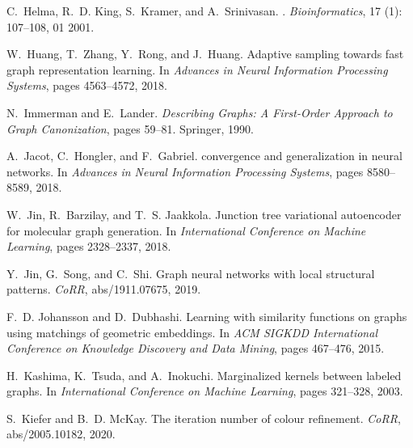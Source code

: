 \documentclass{article}
\theoremstyle{definition}
\begin{document}
\begin{thebibliography}{125}
	C.~Helma, R.~D. King, S.~Kramer, and A.~Srinivasan.
	.
	\newblock \emph{Bioinformatics}, 17 (1): 107--108, 01 2001.
	
	W.~Huang, T.~Zhang, Y.~Rong, and J.~Huang.
	\newblock Adaptive sampling towards fast graph representation learning.
	\newblock In \emph{Advances in Neural Information Processing Systems}, pages
	4563--4572, 2018.
	
	N.~Immerman and E.~Lander.
	\newblock \emph{Describing Graphs: {A} First-Order Approach to Graph
		Canonization}, pages 59--81.
	\newblock Springer, 1990.
	
	A.~Jacot, C.~Hongler, and F.~Gabriel.
	 convergence and generalization in neural
	networks.
	\newblock In \emph{Advances in Neural Information Processing Systems}, pages
	8580--8589, 2018.
	
	W.~Jin, R.~Barzilay, and T.~S. Jaakkola.
	\newblock Junction tree variational autoencoder for molecular graph generation.
	\newblock In \emph{International Conference on Machine Learning}, pages
	2328--2337, 2018.
	
	Y.~Jin, G.~Song, and C.~Shi.
	 {G}raph neural networks with local structural patterns.
	\newblock \emph{CoRR}, abs/1911.07675, 2019.
	
	F.~D. Johansson and D.~Dubhashi.
	\newblock Learning with similarity functions on graphs using matchings of
	geometric embeddings.
	\newblock In \emph{ACM SIGKDD International Conference on Knowledge Discovery
		and Data Mining}, pages 467--476, 2015.
	
	H.~Kashima, K.~Tsuda, and A.~Inokuchi.
	\newblock Marginalized kernels between labeled graphs.
	\newblock In \emph{International Conference on Machine Learning}, pages
	321--328, 2003.
	
	S.~Kiefer and B.~D. McKay.
	\newblock The iteration number of colour refinement.
	\newblock \emph{CoRR}, abs/2005.10182, 2020.
	

\end{thebibliography}
\end{document}
